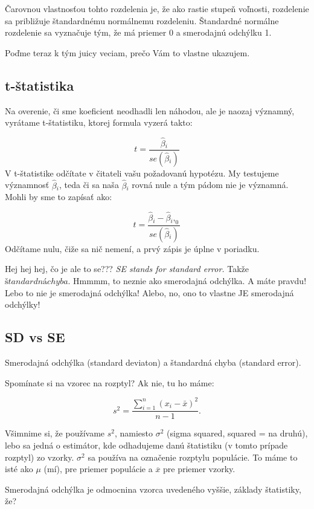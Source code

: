 Čarovnou vlastnosťou tohto rozdelenia je, že ako rastie stupeň voľnosti,
rozdelenie sa približuje štandardnému normálnemu rozdeleniu. Štandardné
normálne rozdelenie sa vyznačuje tým, že má priemer 0 a smerodajnú
odchýlku 1.

Poďme teraz k tým juicy veciam, prečo Vám to vlastne ukazujem.

\hypertarget{t-ux161tatistika}{%
\subsection{t-štatistika}\label{t-ux161tatistika}}

Na overenie, či sme koeficient neodhadli len náhodou, ale je naozaj
významný, vyrátame t-štatistiku, ktorej formula vyzerá takto:

\[t = \frac{\hat\beta{}_i}{se(\hat\beta{}_i)}\] V t-štatistike odčítate
v čitateli vašu požadovanú hypotézu. My testujeme významnosť
\(\hat\beta{}_i\), teda či sa naša \(\hat\beta{}_i\) rovná nule a tým
pádom nie je významná. Mohli by sme to zapísať ako:

\[t = \frac{\hat\beta{}_i - \hat\beta{}_i,_0}{se(\hat\beta{}_i)}\]
Odčítame nulu, čiže sa nič nemení, a prvý zápis je úplne v poriadku.

Hej hej hej, čo je ale to se??? \emph{SE stands for standard error.}
Takže \(štandardná chyba\). Hmmmm, to neznie ako smerodajná odchýlka. A
máte pravdu! Lebo to nie je smerodajná odchýlka! Alebo, no, ono to
vlastne JE smerodajná odchýlky!

\hypertarget{sd-vs-se}{%
\subsection{SD vs SE}\label{sd-vs-se}}

Smerodajná odchýlka (standard deviaton) a štandardná chyba (standard
error).

Spomínate si na vzorec na rozptyl? Ak nie, tu ho máme:

\[s^{2} = \frac{\sum_{i=1}^{n} \left(x_{i} - \bar{x}\right)^{2}} {n-1}.\]

Všimnime si, že používame \(s^{2}\), namiesto \(\sigma^{2}\) (sigma
squared, squared = na druhú), lebo sa jedná o estimátor, kde odhadujeme
danú štatistiku (v tomto prípade rozptyl) zo vzorky. \(\sigma^{2}\) sa
používa na označenie rozptylu populácie. To máme to isté ako \(\mu\)
(mí), pre priemer populácie a \(\overline{x}\) pre priemer vzorky.

Smerodajná odchýlka je odmocnina vzorca uvedeného vyššie, základy
štatistiky, že?

